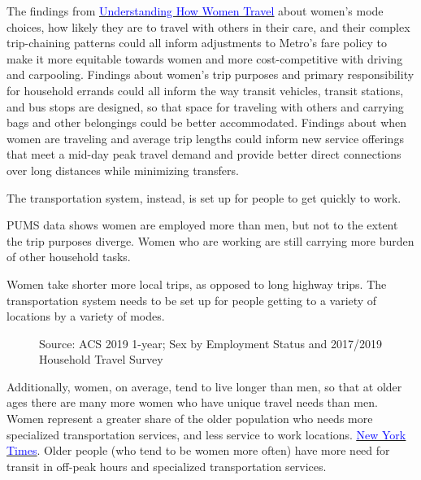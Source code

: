 \documentclass[
  12pt,
]{article}
\begin{document}
\begin{flushleft}
\begin{flushleft}
The findings from \href{https://thesource.metro.net/2019/09/19/metro-releases-understanding-how-women-travel-report/}{\underline{\textcolor{blue}{Understanding How Women Travel}}} about women’s mode choices, how likely they are to travel with others in their care, and their complex trip-chaining patterns could all inform adjustments to Metro’s fare policy to make it more equitable towards women and more cost-competitive with driving and carpooling. Findings about women’s trip purposes and primary responsibility for household errands could all inform the way transit vehicles, transit stations, and bus stops are designed, so that space for traveling with others and carrying bags and other belongings could be better accommodated. Findings about when women are traveling and average trip lengths could inform new service offerings that meet a mid-day peak travel demand and provide better direct connections over long distances while minimizing transfers. 

The transportation system, instead, is set up for people to get quickly to work.

PUMS data shows women are employed more than men, but not to the extent the trip purposes diverge. Women who are working are still carrying more burden of other household tasks.

Women take shorter more local trips, as opposed to long highway trips. The transportation system needs to be set up for people getting to a variety of locations by a variety of modes.
\end{flushleft}

\begin{figure}[H]
\caption{Source: ACS 2019 1-year; Sex by Employment Status and 2017/2019 Household Travel Survey}\label{fig:matrix}
\end{figure}

\begin{flushleft}
Additionally, women, on average, tend to live longer than men, so that at older ages there are many more women who have unique travel needs than men. Women represent a greater share of the older population who needs more specialized transportation services, and less service to work locations. \href{https://www.nytimes.com/2022/12/03/health/elderly-living-alone.html}{\underline{\textcolor{blue}{New York Times}}}.  Older people (who tend to be women more often) have more need for transit in off-peak hours and specialized transportation services. 
\end{flushleft}


\end{flushleft}
\end{document}
